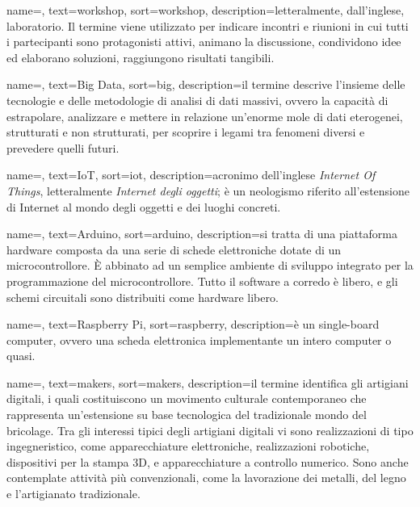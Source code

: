 {
	name=,
    text=workshop,
    sort=workshop,
    description={letteralmente, dall'inglese, laboratorio. Il termine viene utilizzato per indicare incontri e riunioni in cui tutti i partecipanti sono protagonisti attivi, animano la discussione, condividono idee ed elaborano soluzioni, raggiungono risultati tangibili.}
}

{
	name=,
    text=Big Data,
    sort=big,
    description={il termine descrive l'insieme delle tecnologie e delle metodologie di analisi di dati massivi, ovvero la capacità di estrapolare, analizzare e mettere in relazione un'enorme mole di dati eterogenei, strutturati e non strutturati, per scoprire i legami tra fenomeni diversi e prevedere quelli futuri.}
}

{
	name=,
    text=IoT,
    sort=iot,
    description={acronimo dell'inglese \textit{Internet Of Things}, letteralmente \textit{Internet degli oggetti}; è un neologismo riferito all'estensione di Internet al mondo degli oggetti e dei luoghi concreti.}
}

{
	name=,
    text=Arduino,
    sort=arduino,
    description={si tratta di una piattaforma hardware composta da una serie di schede elettroniche dotate di un microcontrollore. È abbinato ad un semplice ambiente di sviluppo integrato per la programmazione del microcontrollore. Tutto il software a corredo è libero, e gli schemi circuitali sono distribuiti come hardware libero.}
}

{
	name=,
    text=Raspberry Pi,
    sort=raspberry,
    description={è un single-board computer, ovvero una scheda elettronica implementante un intero computer o quasi.}
}

{
	name=,
    text=makers,
    sort=makers,
    description={il termine identifica gli artigiani digitali, i quali costituiscono un movimento culturale contemporaneo che rappresenta un'estensione su base tecnologica del tradizionale mondo del bricolage. Tra gli interessi tipici degli artigiani digitali vi sono realizzazioni di tipo ingegneristico, come apparecchiature elettroniche, realizzazioni robotiche, dispositivi per la stampa 3D, e apparecchiature a controllo numerico. Sono anche contemplate attività più convenzionali, come la lavorazione dei metalli, del legno e l'artigianato tradizionale.}
}

